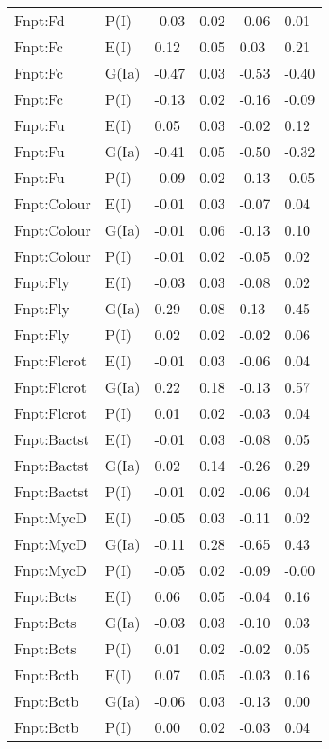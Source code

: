 \begin{center}
\begin{longtable}{|p{1.1in}|p{0.7in}|p{0.7in}|p{0.6in}|p{0.6in}|p{0.6in}|}
  Fnpt:Fd & P(I) & -0.03 & 0.02 & -0.06 & 0.01 \\ 
  Fnpt:Fc & E(I) & 0.12 & 0.05 & 0.03 & 0.21 \\ 
  Fnpt:Fc & G(Ia) & -0.47 & 0.03 & -0.53 & -0.40 \\ 
  Fnpt:Fc & P(I) & -0.13 & 0.02 & -0.16 & -0.09 \\ 
  Fnpt:Fu & E(I) & 0.05 & 0.03 & -0.02 & 0.12 \\ 
  Fnpt:Fu & G(Ia) & -0.41 & 0.05 & -0.50 & -0.32 \\ 
  Fnpt:Fu & P(I) & -0.09 & 0.02 & -0.13 & -0.05 \\ 
  Fnpt:Colour & E(I) & -0.01 & 0.03 & -0.07 & 0.04 \\ 
  Fnpt:Colour & G(Ia) & -0.01 & 0.06 & -0.13 & 0.10 \\ 
  Fnpt:Colour & P(I) & -0.01 & 0.02 & -0.05 & 0.02 \\ 
  Fnpt:Fly & E(I) & -0.03 & 0.03 & -0.08 & 0.02 \\ 
  Fnpt:Fly & G(Ia) & 0.29 & 0.08 & 0.13 & 0.45 \\ 
  Fnpt:Fly & P(I) & 0.02 & 0.02 & -0.02 & 0.06 \\ 
  Fnpt:Flcrot & E(I) & -0.01 & 0.03 & -0.06 & 0.04 \\ 
  Fnpt:Flcrot & G(Ia) & 0.22 & 0.18 & -0.13 & 0.57 \\ 
  Fnpt:Flcrot & P(I) & 0.01 & 0.02 & -0.03 & 0.04 \\ 
  Fnpt:Bactst & E(I) & -0.01 & 0.03 & -0.08 & 0.05 \\ 
  Fnpt:Bactst & G(Ia) & 0.02 & 0.14 & -0.26 & 0.29 \\ 
  Fnpt:Bactst & P(I) & -0.01 & 0.02 & -0.06 & 0.04 \\ 
  Fnpt:MycD & E(I) & -0.05 & 0.03 & -0.11 & 0.02 \\ 
  Fnpt:MycD & G(Ia) & -0.11 & 0.28 & -0.65 & 0.43 \\ 
  Fnpt:MycD & P(I) & -0.05 & 0.02 & -0.09 & -0.00 \\ 
  Fnpt:Bcts & E(I) & 0.06 & 0.05 & -0.04 & 0.16 \\ 
  Fnpt:Bcts & G(Ia) & -0.03 & 0.03 & -0.10 & 0.03 \\ 
  Fnpt:Bcts & P(I) & 0.01 & 0.02 & -0.02 & 0.05 \\ 
  Fnpt:Bctb & E(I) & 0.07 & 0.05 & -0.03 & 0.16 \\ 
  Fnpt:Bctb & G(Ia) & -0.06 & 0.03 & -0.13 & 0.00 \\ 
  Fnpt:Bctb & P(I) & 0.00 & 0.02 & -0.03 & 0.04 \\ 

\end{longtable}
\end{center}
